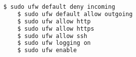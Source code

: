 \begin{lstlisting}[language=bash,caption=Konfiguration der UFW mit ad-hoc Kommandos,label={lst:ad-hoc-config}]
    $ sudo ufw default deny incoming
    $ sudo ufw default allow outgoing
    $ sudo ufw allow http
    $ sudo ufw allow https
    $ sudo ufw allow ssh
    $ sudo ufw logging on
    $ sudo ufw enable
\end{lstlisting}